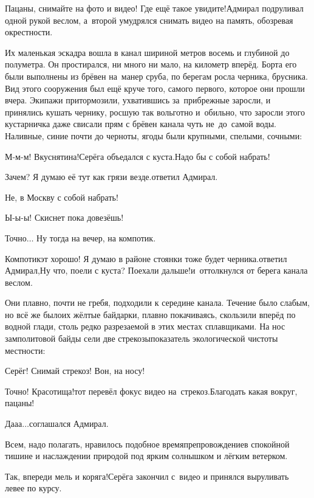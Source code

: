 \diagdash Пацаны, снимайте на фото и видео! Где ещё такое увидите!\mdash Адмирал подруливал одной рукой веслом, а~второй умудрялся снимать видео на память, обозревая окрестности. 

Их маленькая эскадра вошла в канал шириной метров восемь и глубиной до полуметра. Он простирался, ни много ни мало, на километр вперёд. Борта его были выполнены из брёвен на~манер сруба, по берегам росла черника, брусника. Вид этого сооружения был ещё круче того, самого первого, которое они прошли вчера. Экипажи притормозили, ухватившись за~прибрежные заросли, и принялись кушать чернику, росшую так вольготно и~обильно, что заросли этого кустарничка даже свисали прям с брёвен канала чуть не~до~самой воды. Наливные, синие почти до черноты, ягоды были крупными, спелыми, сочными:

\diagdash М-м-м! Вкуснятина!\mdash Серёга объедался с куста.\mdash Надо бы с собой набрать!

\diagdash Зачем? Я думаю её тут как грязи везде.\mdash ответил Адмирал.

\diagdash Не, в Москву с собой набрать!

\diagdash Ы-ы-ы! Скиснет пока довезёшь!

\diagdash Точно$\ldots$ Ну тогда на вечер, на компотик.

\diagdash Компотик\mdash эт хорошо! Я думаю в районе стоянки тоже будет черника.\mdash ответил Адмирал,\mdash Ну что, поели с куста? Поехали дальше!\mdash и~оттолкнулся от берега канала веслом.

Они плавно, почти не гребя, подходили к середине канала. Течение было слабым, но всё же было\mdash их жёлтые байдарки, плавно покачиваясь, скользили вперёд по водной глади, столь редко разрезаемой в этих местах сплавщиками. На нос замполитовой байды сели две стрекозы\mdash показатель экологической чистоты местности:

\diagdash Серёг! Снимай стрекоз! Вон, на носу!

\diagdash Точно! Красотища!\mdash тот перевёл фокус видео на~стрекоз.\mdash Благодать какая вокруг, пацаны!

\diagdash Да\sdash а\sdash а$\ldots$\mdash соглашался Адмирал.

Всем, надо полагать, нравилось подобное времяпрепровождение\mdash в спокойной тишине и наслаждении природой под ярким солнышком и лёгким ветерком. 

\diagdash Так, впереди мель и коряга!\mdash Серёга закончил с~видео и принялся выруливать левее по курсу. 

